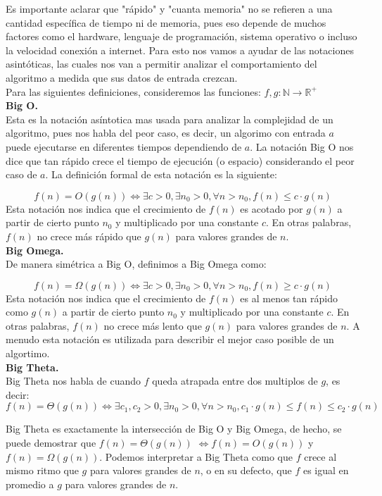 \documentclass[
 12pt,
 letterpaper,
]{article}
\theoremstyle{teoremaBreak}
\theoremstyle{plain}
\theoremstyle{definition}
\begin{document}
Es importante aclarar que "rápido" y "cuanta memoria" no se refieren a una cantidad específica de tiempo ni 
de memoria, pues eso depende de muchos factores como el hardware, lenguaje de programación, sistema operativo
o incluso la velocidad conexión a internet. Para esto nos vamos a ayudar de las notaciones asintóticas,
las cuales nos van a permitir analizar el comportamiento del algoritmo a medida que sus datos de entrada crezcan.\\

Para las siguientes definiciones, consideremos las funciones:
$f, g: \mathbb{N} \to \mathbb{R}^+$ \\

\textbf{Big O.}\\
Esta es la notación asíntotica mas usada para analizar la complejidad de un algoritmo, pues nos habla del peor caso,
es decir, un algorimo con entrada $a$ puede ejecutarse en diferentes tiempos dependiendo de $a$. La notación 
Big O nos dice que tan rápido crece el tiempo de ejecución (o espacio) considerando el peor caso de $a$. La definición formal de esta notación es la siguiente:

$$f(n) = O(g(n)) \Leftrightarrow \exists c > 0, \exists n_0 > 0, \forall n > n_0, f(n) \leq c \cdot g(n)$$
Esta notación nos indica que el crecimiento de $f(n)$ es acotado por $g(n)$ a partir de cierto punto $n_0$ y 
multiplicado por una constante $c$. En otras palabras, $f(n)$ no crece más rápido que $g(n)$ para valores grandes de $n$.
\\

\textbf{Big Omega.}\\
De manera simétrica a Big O, definimos a Big Omega como:

$$f(n) = \Omega(g(n)) \Leftrightarrow \exists c > 0, \exists n_0 > 0, \forall n > n_0, f(n) \geq c \cdot g(n)$$ 
Esta notación nos indica que el crecimiento de $f(n)$ es al menos tan rápido como $g(n)$ a partir de cierto punto $n_0$ y multiplicado por una constante $c$. En otras palabras, $f(n)$ no crece más lento que $g(n)$ para valores grandes de $n$. 
A menudo esta notación es utilizada para describir el mejor caso posible de un algortimo.
\\
\textbf{Big Theta.}\\
Big Theta nos habla de cuando $f$ queda atrapada entre dos multiplos de $g$, es decir:
$$f(n) = \Theta(g(n)) \Leftrightarrow \exists c_1,c_2 > 0, \exists n_0 > 0, \forall n > n_0, c_1 \cdot g(n) \leq f(n) \leq c_2 \cdot g(n)$$

Big Theta es exactamente la intersección de Big O y Big Omega, de hecho, se puede demostrar que 
$f(n) = \Theta(g(n))$ $\Leftrightarrow f(n) = O(g(n))$ y $f(n) = \Omega(g(n))$.
Podemos interpretar a Big Theta como que $f$ crece al mismo ritmo que $g$ para valores grandes de $n$, o 
en su defecto, que $f$ es igual en promedio a $g$ para valores grandes de $n$.
\end{document}

